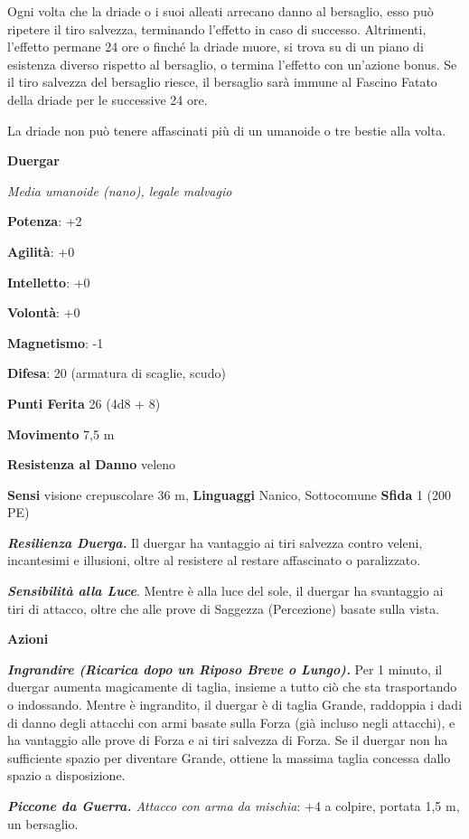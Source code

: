 \begin{multicols}{2}
Ogni volta che la driade o i suoi alleati arrecano danno al bersaglio,
esso può ripetere il tiro salvezza, terminando l'effetto in caso di
successo. Altrimenti, l'effetto permane 24 ore o finché la driade muore,
si trova su di un piano di esistenza diverso rispetto al bersaglio, o
termina l'effetto con un'azione bonus. Se il tiro salvezza del bersaglio
riesce, il bersaglio sarà immune al Fascino Fatato della driade per le
successive 24 ore.

La driade non può tenere affascinati più di un umanoide o tre bestie
alla volta.

\textbf{Duergar}

\emph{Media umanoide (nano), legale malvagio}

\textbf{Potenza}: +2

\textbf{Agilità}: +0

\textbf{Intelletto}: +0

\textbf{Volontà}: +0

\textbf{Magnetismo}: -1

\textbf{Difesa}: 20 (armatura di scaglie, scudo)

\textbf{Punti Ferita} 26 (4d8 + 8)

\textbf{Movimento} 7,5 m

\textbf{Resistenza al Danno} veleno

\textbf{Sensi} visione crepuscolare 36 m, 
\textbf{Linguaggi} Nanico, Sottocomune \textbf{Sfida} 1 (200 PE)

\emph{\textbf{Resilienza Duerga.}} Il duergar ha vantaggio ai tiri
salvezza contro veleni, incantesimi e illusioni, oltre al resistere al
restare affascinato o paralizzato.

\emph{\textbf{Sensibilità alla Luce}}. Mentre è alla luce del sole, il
duergar ha svantaggio ai tiri di attacco, oltre che alle prove di
Saggezza (Percezione) basate sulla vista.

\textbf{Azioni}

\emph{\textbf{Ingrandire (Ricarica dopo un Riposo Breve o Lungo).}} Per
1 minuto, il duergar aumenta magicamente di taglia, insieme a tutto ciò
che sta trasportando o indossando. Mentre è ingrandito, il duergar è di
taglia Grande, raddoppia i dadi di danno degli attacchi con armi basate
sulla Forza (già incluso negli attacchi), e ha vantaggio alle prove di
Forza e ai tiri salvezza di Forza. Se il duergar non ha sufficiente
spazio per diventare Grande, ottiene la massima taglia concessa dallo
spazio a disposizione.

\emph{\textbf{Piccone da Guerra.} Attacco con arma da mischia}: +4 a
colpire, portata 1,5 m, un bersaglio.


\end{multicols}
